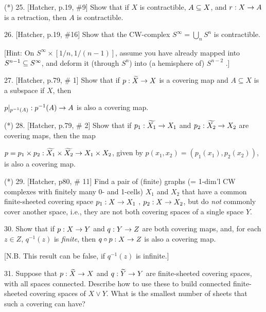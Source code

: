 \documentclass[12pt]{article}
\begin{document}
\begin{description}


\item{(*)} 25. [Hatcher, p.19, \#9] Show that if $X$ is contractible,
$A\subseteq X$, and $r:X\rightarrow A$ is a retraction, then $A$ is contractible.

\msk

\item{26.} [Hatcher, p.19, \#16] Show that the CW-complex $S^\infty=\bigcup_n S^n$
is contractible. 

\ssk

\item{\spc} [Hint: On $S^{\infty}\times[1/n,1/(n-1)]$, assume you have already mapped
into $S^{n-1}\subseteq S^{\infty}$, and deform it (through $S^{n}$) into (a hemisphere of) $S^{n-2}$ .]

\msk


\item{27.} [Hatcher, p.79, \# 1] 
Show that if $p:\widetilde{X}\rightarrow X$ is a covering map and $A\subseteq X$ is
a subspace if $X$, then 

\item{\spc} $p|_{p^{-1}(A)}:p^{-1}(A)\rightarrow A$ is also a covering map.

\msk

\item{(*)} 28. [Hatcher, p.79, \# 2] Show that if $p_1:\widetilde{X_1}\rightarrow X_1$ and $p_2:\widetilde{X_2}\rightarrow X_2$ are
covering maps, then the map 

\ssk

$p=p_1\times p_2:\widetilde{X_1}\times\widetilde{X_2}\rightarrow X_1\times X_2$,
given by $p(x_1,x_2)=(p_1(x_1),p_2(x_2))$, is also a covering map.

\msk

\item{(*)} 29. [Hatcher, p80, \# 11] Find a pair of (finite) graphs (= 1-dim'l CW complexes with finitely
many 0- and 1-cells) $X_1$ and $X_2$ that have a common finite-sheeted covering space 
$p_1:X\rightarrow X_1$ , $p_2:X\rightarrow X_2$, but do {\it not} commonly cover another space, i.e., 
they are not both covering spaces of a single space $Y$.

\msk

\item{30.} Show that if $p:X\rightarrow Y$ and $q:Y\rightarrow Z$ are both covering maps, and, for
each $z\in Z$, $q^{-1}(z)$ is {\it finite}, then $q\circ p:X\rightarrow Z$ is also a covering
map.

\ssk

\item{\spc} [N.B. This result can be false, if $q^{-1}(z)$ is infinite.]

\msk

\item{31.} Suppose that $p:\widetilde{X}\rightarrow X$ and $q:\widetilde{Y}\rightarrow Y$ are finite-sheeted
covering spaces, with all spaces connected. Describe how to use these to build 
connected finite-sheeted covering spaces of $X\vee Y$. What is the smallest number
of sheets that such a covering can have?

\end{description}
\vfill
\end{document}
